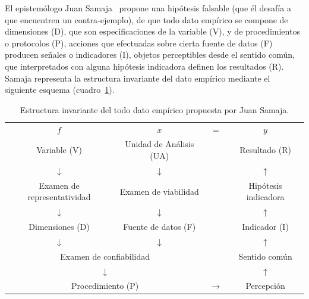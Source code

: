 \documentclass[a4paper,11pt]{book}
\theoremstyle{definition}
\begin{document}
El epistemólogo Juan Samaja~\cite{samaja} propone una hipótesis falsable (que él desafía a que encuentren un contra-ejemplo), de que todo dato empírico se compone de dimensiones (D), que son especificaciones de la variable (V), y de procedimientos o protocolos (P), acciones que efectuadas sobre cierta fuente de datos (F) producen señales o indicadores (I), objetos perceptibles desde el sentido común, que interpretados con alguna hipótesis indicadora definen los resultados (R).
%
Samaja representa la estructura invariante del dato empírico mediante el siguiente esquema (cuadro~\ref{tab:matriz_datos}).
%
\begin{table}[ht!]
\centering \footnotesize
\begin{tabular}{cccc}
$f$ & \normalsize $x$ &\normalsize  = & $y$    \\
  \normalsize  Variable (V) & \normalsize  Unidad de Análisis (UA) &\normalsize   &\normalsize  Resultado (R)    \\ \hline
 $\downarrow$ &$\downarrow$&&$\uparrow$ \\
 Examen de representatividad &Examen de viabilidad & & Hipótesis indicadora \\
 $\downarrow$ &$\downarrow$&&$\uparrow$ \\
 \normalsize Dimensiones (D) & \normalsize Fuente de datos (F) &  & \normalsize Indicador (I) \\
 $\downarrow$ &$\downarrow$&&$\uparrow$ \\
 \multicolumn{2}{c}{Examen de confiabilidad} & & Sentido común \\
 \multicolumn{2}{c}{$\downarrow$} & &$\uparrow$ \\
 \multicolumn{2}{c}{\normalsize Procedimiento (P)} & $\rightarrow$ & \normalsize Percepción \\
\end{tabular}
\caption{Estructura invariante del todo dato empírico propuesta por Juan Samaja.}
\label{tab:matriz_datos}
\end{table}

\end{document}
